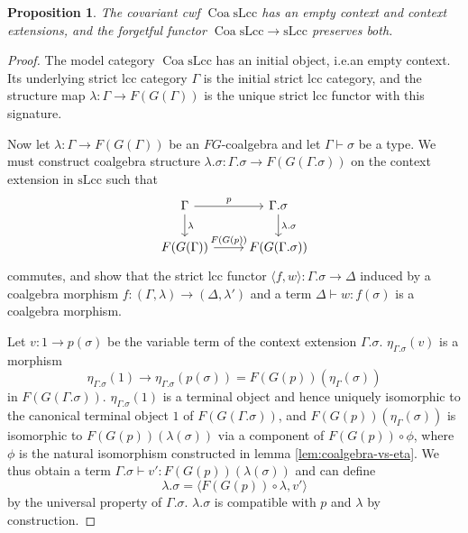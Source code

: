 \documentclass[a4paper]{article}
\newtheorem{proposition}[theorem]{Proposition}
\theoremstyle{remark}
\theoremstyle{definition}
\begin{document}
\begin{proposition}
  \label{prop:coa-slcc-exts}
  The covariant cwf $\operatorname{Coa} \mathrm{sLcc}$ has an empty context and context extensions, and the forgetful functor $\operatorname{Coa} \mathrm{sLcc} \rightarrow \mathrm{sLcc}$ preserves both.
\end{proposition}
\begin{proof}
  The model category $\operatorname{Coa} \mathrm{sLcc}$ has an initial object, i.e.\@ an empty context.
  Its underlying strict lcc category $\Gamma$ is the initial strict lcc category, and the structure map $\lambda : \Gamma \rightarrow F(G(\Gamma))$ is the unique strict lcc functor with this signature.

  Now let $\lambda : \Gamma \rightarrow F(G(\Gamma))$ be an $FG$-coalgebra and let $\Gamma \vdash \sigma$ be a type.
  We must construct coalgebra structure $\lambda.\sigma : \Gamma.\sigma \rightarrow F(G(\Gamma.\sigma))$ on the context extension in $\mathrm{sLcc}$ such that
  \begin{equation}
    \begin{tikzcd}
      \Gamma \arrow[r, "p"] \arrow[d, "\lambda"] & \Gamma.\sigma \arrow[d, "\lambda.\sigma"] \\
      F(G(\Gamma)) \arrow[r, "F(G(p))"] & F(G(\Gamma.\sigma))
    \end{tikzcd}
  \end{equation}
  commutes, and show that the strict lcc functor $\langle f, w \rangle : \Gamma.\sigma \rightarrow \Delta$ induced by a coalgebra morphism $f : (\Gamma, \lambda) \rightarrow (\Delta, \lambda')$ and a term $\Delta \vdash w : f(\sigma)$ is a coalgebra morphism.

  Let $v : 1 \rightarrow p(\sigma)$ be the variable term of the context extension $\Gamma.\sigma$.
  $\eta_{\Gamma.\sigma}(v)$ is a morphism
  \begin{equation}
    \eta_{\Gamma.\sigma}(1) \rightarrow \eta_{\Gamma.\sigma}(p(\sigma)) = F(G(p))(\eta_\Gamma(\sigma))
  \end{equation}
  in $F(G(\Gamma.\sigma))$.
  $\eta_{\Gamma.\sigma}(1)$ is a terminal object and hence uniquely isomorphic to the canonical terminal object $1$ of $F(G(\Gamma.\sigma))$, and $F(G(p))(\eta_\Gamma(\sigma))$ is isomorphic to $F(G(p))(\lambda(\sigma))$ via a component of $F(G(p)) \circ \phi$, where $\phi$ is the natural isomorphism constructed in lemma \ref{lem:coalgebra-vs-eta}.
  We thus obtain a term $\Gamma.\sigma \vdash v' : F(G(p))(\lambda(\sigma))$ and can define
  \begin{equation}
    \lambda.\sigma = \langle F(G(p)) \circ \lambda, v' \rangle
  \end{equation}
  by the universal property of $\Gamma.\sigma$.
  $\lambda.\sigma$ is compatible with $p$ and $\lambda$ by construction.


\end{proof}
\end{document}
